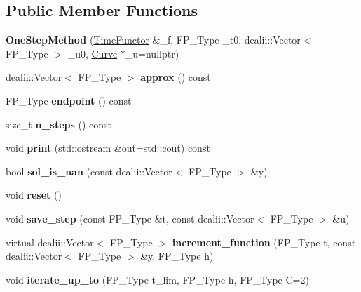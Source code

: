 \subsection*{Public Member Functions}
\begin{DoxyCompactItemize}
\item 
\mbox{\label{classOneStepMethod_aa29cf55321c2a83634b93ec42a32c500}} 
{\bfseries One\+Step\+Method} (\hyperlink{classTimeFunctor}{Time\+Functor} \&\+\_\+f, F\+P\+\_\+\+Type \+\_\+t0, dealii\+::\+Vector$<$ F\+P\+\_\+\+Type $>$ \+\_\+u0, \hyperlink{classCurve}{Curve} $\ast$\+\_\+u=nullptr)
\item 
\mbox{\label{classOneStepMethod_a90a5bfa6317794d9003939e660c48e5d}} 
dealii\+::\+Vector$<$ F\+P\+\_\+\+Type $>$ {\bfseries approx} () const
\item 
\mbox{\label{classOneStepMethod_a5fa1efcb274907b97f31cfbbb0c5dc07}} 
F\+P\+\_\+\+Type {\bfseries endpoint} () const
\item 
\mbox{\label{classOneStepMethod_a7ae5bcaf0c1e48551456a6f0835414d2}} 
size\+\_\+t {\bfseries n\+\_\+steps} () const
\item 
\mbox{\label{classOneStepMethod_aa3fc1d095086c736ef23c60e56034474}} 
void {\bfseries print} (std\+::ostream \&out=std\+::cout) const
\item 
\mbox{\label{classOneStepMethod_a9d448dbaafc95b02ce6bc88cc33c8363}} 
bool {\bfseries sol\+\_\+is\+\_\+nan} (const dealii\+::\+Vector$<$ F\+P\+\_\+\+Type $>$ \&y)
\item 
\mbox{\label{classOneStepMethod_a4e6743b0343a6c5bb75e423649915b86}} 
void {\bfseries reset} ()
\item 
\mbox{\label{classOneStepMethod_ae3c4a4994e2ce22c43f0d3e6902986a4}} 
void {\bfseries save\+\_\+step} (const F\+P\+\_\+\+Type \&t, const dealii\+::\+Vector$<$ F\+P\+\_\+\+Type $>$ \&u)
\item 
\mbox{\label{classOneStepMethod_ad2298660914a06674080194c8c97e1b1}} 
virtual dealii\+::\+Vector$<$ F\+P\+\_\+\+Type $>$ {\bfseries increment\+\_\+function} (F\+P\+\_\+\+Type t, const dealii\+::\+Vector$<$ F\+P\+\_\+\+Type $>$ \&y, F\+P\+\_\+\+Type h)
\item 
\mbox{\label{classOneStepMethod_adf00efa88d6fb3d1e9f7b3024375a0b4}} 
void {\bfseries iterate\+\_\+up\+\_\+to} (F\+P\+\_\+\+Type t\+\_\+lim, F\+P\+\_\+\+Type h, F\+P\+\_\+\+Type C=2)
\end{DoxyCompactItemize}
